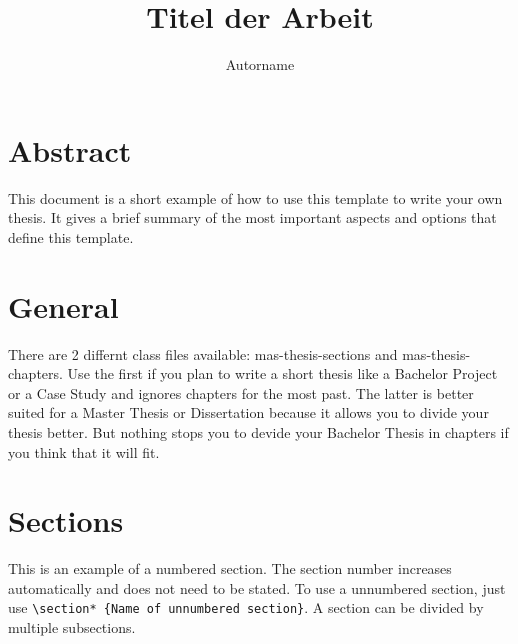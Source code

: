 \documentclass[bachelorarbeit,grey]{mas-thesis-sections}				%
\author{Autorname}
\title{Titel der Arbeit}
\begin{document}
\maketitle				%

\cleardoublepage

\tableofcontents		%

\cleardoublepage

\listofillustrations	%


\cleardoublepage

\setcounter{page}{1}


\section{Abstract}

This document is a short example of how to use this template to write your own thesis. It gives a brief summary of the most important aspects and options that define this template.

\newpage


\section{General}

There are 2 differnt class files available: mas-thesis-sections and mas-thesis-chapters. Use the first if you plan to write a short thesis like a Bachelor Project or a Case Study and ignores chapters for the most past. The latter is better suited for a Master Thesis or Dissertation because it allows you to divide your thesis better. But nothing stops you to devide your Bachelor Thesis in chapters if you think that it will fit.

\newpage


\section{Sections}

This is an example of a numbered section. The section number increases automatically and does not need to be stated. To use a unnumbered section, just use \texttt{\textbackslash section* \{Name of unnumbered section\}}. A section can be divided by multiple subsections.
\end{document}
